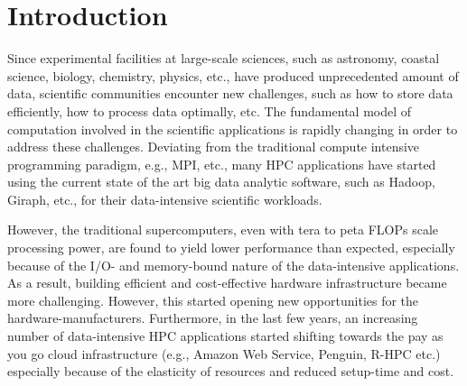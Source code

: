 \documentclass[conference]{IEEEtran}
\begin{document}


%
\IEEEpeerreviewmaketitle



\section {Introduction}
Since experimental facilities at large-scale sciences, such as astronomy, coastal science, biology, chemistry, physics, etc., have produced unprecedented amount of data, scientific communities encounter new challenges, such as how to store data efficiently, how to process data optimally, etc. 
The fundamental model of computation involved in the scientific applications is rapidly changing in order to address these challenges.
Deviating from the traditional compute intensive programming paradigm, e.g., MPI, etc., many HPC applications have started using the current state of the art big data analytic software, such as Hadoop, Giraph, etc., for their data-intensive scientific workloads. 

However, the traditional supercomputers, even with tera to peta FLOPs scale processing power, are found to yield lower performance than expected, especially because of the I/O- and memory-bound nature of the data-intensive applications. 
As a result, building efficient and cost-effective hardware infrastructure became more challenging. However, this started opening new opportunities for the hardware-manufacturers. 
Furthermore, in the last few years, an increasing number of data-intensive HPC applications started shifting towards the pay as you go cloud infrastructure (e.g., Amazon Web Service, Penguin, R-HPC etc.) especially because of the elasticity of resources and reduced setup-time and cost. 
\end{document}
